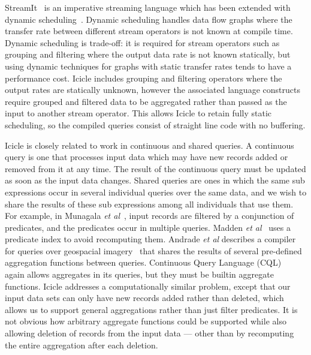 StreamIt~\cite{thies2002streamit} is an imperative streaming language which has been extended with dynamic scheduling~\cite{soule2013dynamic}. Dynamic scheduling handles data flow graphs where the transfer rate between different stream operators is not known at compile time. Dynamic scheduling is trade-off: it is required for stream operators such as grouping and filtering where the output data rate is not known statically, but using dynamic techniques for graphs with static transfer rates tends to have a performance cost. Icicle includes grouping and filtering operators where the output rates are statically unknown, however the associated language constructs require grouped and filtered data to be aggregated rather than passed as the input to another stream operator. This allows Icicle to retain fully static scheduling, so the compiled queries consist of straight line code with no buffering.

Icicle is closely related to work in continuous and shared queries. A continuous query is one that processes input data which may have new records added or removed from it at any time. The result of the continuous query must be updated as soon as the input data changes. Shared queries are ones in which the same sub expressions occur in several individual queries over the same data, and we wish to share the results of these sub expressions among all individuals that use them. For example, in Munagala \emph{et al}~\cite{munagala2007optimization}, input records are filtered by a conjunction of predicates, and the predicates occur in multiple queries. Madden \emph{et al}~\cite{madden2002continuously} uses a predicate index to avoid recomputing them. Andrade \emph{et al} describes a compiler for queries over geospacial imagery~\cite{andrade2003efficient} that shares the results of several pre-defined aggregation functions between queries. Continuous Query Language (CQL)~\cite{arasu2002abstract,stream2003stream} again allows aggregates in its queries, but they must be builtin aggregate functions. Icicle addresses a computationally similar problem, except that our input data sets can only have new records added rather than deleted, which allows us to support general aggregations rather than just filter predicates. It is not obvious how arbitrary aggregate functions could be supported while also allowing deletion of records from the input data --- other than by recomputing the entire aggregation after each deletion.



